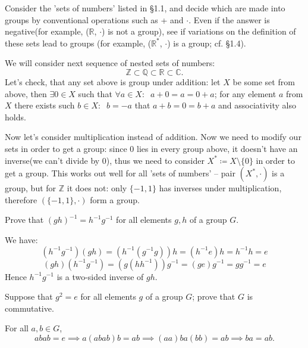 \documentclass[12pt,letterpaper,boxed]{hmcpset}
\newcommand{\R}{\mathbb{R}}
\newcommand{\C}{\mathbb{C}}
\newcommand{\Q}{\mathbb{Q}}
\newcommand{\Z}{\mathbb{Z}}
\newcommand{\inv}[1]{#1^{-1}}
\begin{document}
\begin{problem}[1.2]
	Consider the 'sets of numbers' listed in §1.1, and decide which are made into groups by conventional operations such as + and $\cdot$. Even if the answer is negative(for example, ($\mathbb{R}$, $\cdot$) is not a group), see if variations on the definition of these sets lead to groups (for example, ($\mathbb{R}^*$, $\cdot$) is a group; cf. §1.4).
\end{problem}
\begin{solution}
	We will consider next sequence of nested sets of numbers:
	\[
		\Z \subset \Q \subset \R \subset \C.
	\]
	Let's check, that any set above is group under addition: let $X$ be some set from above, then $\exists 0 \in X$ such that $\forall a \in X: \;\; a+0 = a = 0+a$; for any element $a$ from $X$ there exists such $b \in X: \;\; b=-a$ that $a+b=0=b+a$ and associativity also holds.
	
	Now let's consider multiplication instead of addition. Now we need to modify our sets in order to get a group: since $0$ lies in every group above, it doesn't have an inverse(we can't divide by $0$), thus we need to consider $X^* \coloneqq X \setminus \{0\}$ in order to get a group. This works out well for all 'sets of numbers' -- pair $(X^*, \cdot)$ is a group, but for $\Z$ it does not: only $\{-1,1\}$ has inverses under multiplication, therefore $(\{-1,1\}, \cdot)$ form a group.
\end{solution}

\begin{problem}[1.3]
	Prove that $(gh)^{-1} = \inv{h}\inv{g}$ for all elements $g,h$ of a group $G$.
\end{problem}
\begin{solution}
	We have:
	\[ (\inv{h}\inv{g})(gh) = (\inv{h}(\inv{g}g))h = (\inv{h}e)h = \inv{h}h = e \]
	\[ (gh)(\inv{h}\inv{g}) = (g(h\inv{h}))\inv{g} = (ge)\inv{g} = g\inv{g} = e \]
	Hence $\inv{h}\inv{g}$ is a two-sided inverse of $gh$.
\end{solution}
\begin{problem}[1.4]
	Suppose that $g^2 = e$ for all elements $g$ of a group $G$; prove that $G$ is commutative.
\end{problem}
\begin{solution}
	For all $a,b\in G$,
	\[
	abab=e\implies a(abab)b=ab\implies (aa)ba(bb)=ab\implies ba=ab.
	\]
\end{solution}
\end{document}
